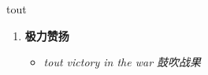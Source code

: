 
\begin{frame}
{\huge tout}
\begin{center}
\begin{enumerate}\Large
  \item \textbf{极力赞扬}
  \begin{itemize}
    \item \em{\Large{tout victory in the war 鼓吹战果}}
  \end{itemize}
\end{enumerate}
\end{center}
\end{frame}
